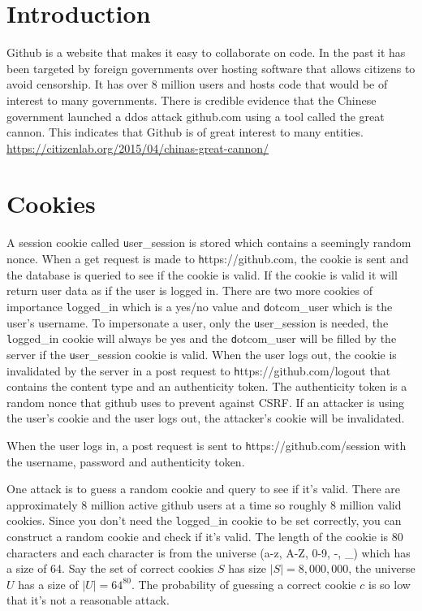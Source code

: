 \documentclass[12pt]{article}
\renewcommand{\tt}[1]{\texttt{#1}}
\begin{document}
\maketitle

\section{Introduction}
Github is a website that makes it easy to collaborate on code. In the past it has been targeted by foreign governments over hosting software that allows citizens to avoid censorship. It has over 8 million users and hosts code that would be of interest to many governments. There is credible evidence that the Chinese government launched a ddos attack github.com using a tool called the great cannon. This indicates that Github is of great interest to many entities. \url{https://citizenlab.org/2015/04/chinas-great-cannon/}

\section{Cookies}\label{cookies}
	A session cookie called {\tt user\_session} is stored which contains a seemingly random nonce. When a get request is made to {\tt https://github.com}, the cookie is sent and the database is queried to see if the cookie is valid. If the cookie is valid it will return user data as if the user is logged in. There are two more cookies of importance {\tt logged\_in} which is a yes/no value and {\tt dotcom\_user} which is the user's username. To impersonate a user, only the {\tt user\_session} is needed, the {\tt logged\_in} cookie will always be yes and the {\tt dotcom\_user} will be filled by the server if the {\tt user\_session} cookie is valid. When the user logs out, the cookie is invalidated by the server in a post request to {\tt https://github.com/logout} that contains the content type and an authenticity token. The authenticity token is a random nonce that github uses to prevent against CSRF. If an attacker is using the user's cookie and the user logs out, the attacker's cookie will be invalidated.

When the user logs in, a post request is sent to {\tt https://github.com/session} with the username, password and authenticity token.

One attack is to guess a random cookie and query to see if it's valid. There are approximately 8 million active github users at a time so roughly 8 million valid cookies. Since you don't need the {\tt logged\_in} cookie to be set correctly, you can construct a random cookie and check if it's valid. The length of the cookie is 80 characters and each character is from the universe (a-z, A-Z, 0-9, -, \_) which has a size of 64. Say the set of correct cookies $S$  has size $|S| = 8,000,000$, the universe $U$ has a size of $|U| = 64^{80}$. The probability of guessing a correct cookie $c$ is so low that it's not a reasonable attack.
\end{document}
